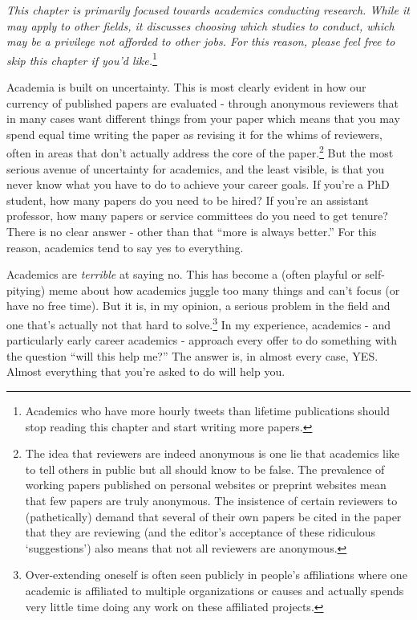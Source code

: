 \documentclass[
  12pt,
]{book}
\begin{document}
\emph{This chapter is primarily focused towards academics conducting research. While it may apply to other fields, it discusses choosing which studies to conduct, which may be a privilege not afforded to other jobs. For this reason, please feel free to skip this chapter if you'd like.}\footnote{Academics who have more hourly tweets than lifetime publications should stop reading this chapter and start writing more papers.}

Academia is built on uncertainty. This is most clearly evident in how our currency of published papers are evaluated - through anonymous reviewers that in many cases want different things from your paper which means that you may spend equal time writing the paper as revising it for the whims of reviewers, often in areas that don't actually address the core of the paper.\footnote{The idea that reviewers are indeed anonymous is one lie that academics like to tell others in public but all should know to be false. The prevalence of working papers published on personal websites or preprint websites mean that few papers are truly anonymous. The insistence of certain reviewers to (pathetically) demand that several of their own papers be cited in the paper that they are reviewing (and the editor's acceptance of these ridiculous `suggestions') also means that not all reviewers are anonymous.} But the most serious avenue of uncertainty for academics, and the least visible, is that you never know what you have to do to achieve your career goals. If you're a PhD student, how many papers do you need to be hired? If you're an assistant professor, how many papers or service committees do you need to get tenure? There is no clear answer - other than that ``more is always better.'' For this reason, academics tend to say yes to everything.

Academics are \emph{terrible} at saying no. This has become a (often playful or self-pitying) meme about how academics juggle too many things and can't focus (or have no free time). But it is, in my opinion, a serious problem in the field and one that's actually not that hard to solve.\footnote{Over-extending oneself is often seen publicly in people's affiliations where one academic is affiliated to multiple organizations or causes and actually spends very little time doing any work on these affiliated projects.} In my experience, academics - and particularly early career academics - approach every offer to do something with the question ``will this help me?'' The answer is, in almost every case, YES. Almost everything that you're asked to do will help you.
\end{document}

